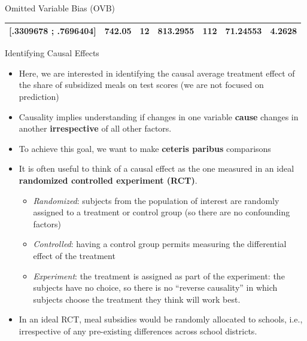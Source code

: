 \documentclass[notes,10pt, aspectratio=169]{beamer}
\begin{document}
\begin{frame}{Omitted Variable Bias (OVB)}
\begin{center}
{\begin{table}[]
\begin{tabular}{l|cc|cc|cc|}
            \multicolumn{1}{|l|}{{[}.3309678 ; .7696404{]}}               & 742.05                                                         & 12                             & 813.2955                                                       & 112                            & \multicolumn{1}{c|}{71.24553}                                     & 4.2628               \\ \hline
            \end{tabular}
            \end{table}
            
}

\end{center}

\end{frame}


\begin{frame}{Identifying Causal Effects}
\begin{itemize}
    \item Here, we are interested in identifying the causal average treatment effect of the share of subsidized meals on test scores (we are not focused on prediction)
    \item Causality implies understanding if changes in one variable \textbf{cause} changes in another \textbf{irrespective} of all other factors.
    \item To achieve this goal, we want to make \textbf{ceteris paribus} comparisons
    \item It is often useful to think of a causal effect as the one measured in an ideal \textbf{randomized controlled experiment (RCT)}.
    \begin{itemize}
        \item \textit{Randomized}: subjects from the population of interest are randomly assigned to a treatment or control group (so there are no confounding factors)
        \item \textit{Controlled}: having a control group permits measuring the differential effect of the treatment
        \item \textit{Experiment}: the treatment is assigned as part of the experiment: the subjects have no choice, so there is no “reverse causality” in which subjects choose the treatment they think will work best.
    \end{itemize}
    \item In an ideal RCT, meal subsidies would be randomly allocated to schools, i.e., irrespective of any pre-existing differences across school districts.
\end{itemize}
\end{frame}
\end{document}
